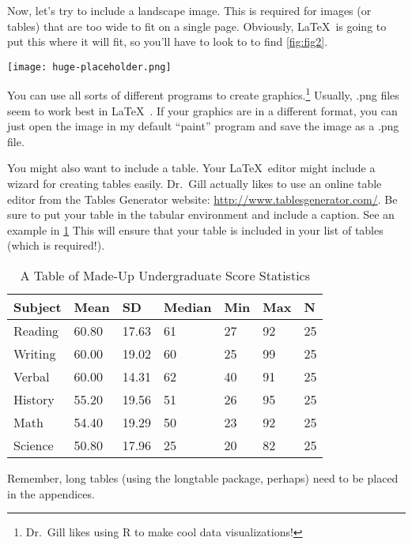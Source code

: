 Now, let's try to include a landscape image. This is required for images (or tables) that are too wide to fit on a single page. Obviously, \LaTeX\ is going to put this where it will fit, so you'll have to look to  to find \cref{fig:fig2}.

\begin{sidewaysfigure}
	\begin{center}
		\texttt{[image: huge-placeholder.png]}
\end{center}
\caption{\label{fig:fig2}This is a Landscape Figure}
\end{sidewaysfigure}

You can use all sorts of different programs to create graphics.\footnote{Dr.\ Gill likes using \textsf{R} to make cool data visualizations!} Usually, .png files seem to work best in \LaTeX\ . If your graphics are in a different format, you can just open the image in my default ``paint'' program and save the image as a .png file. 

You might also want to include a table. Your \LaTeX\ editor might include a wizard for creating tables easily. Dr.\ Gill actually likes to use an online table editor from the Tables Generator website: \url{http://www.tablesgenerator.com/}. Be sure to put your table in the tabular environment and include a caption. See an example in \cref{sampletable} This will ensure that your table is included in your list of tables (which is required!). 

\begin{table}[htbp]
\centering
\caption{A Table of Made-Up Undergraduate Score Statistics}
\label{sampletable}
\begin{tabular}{lllllll} \toprule
Subject & Mean  & SD    & Median & Min & Max & N  \\ \midrule
Reading & 60.80 & 17.63 & 61     & 27  & 92  & 25 \\
Writing & 60.00 & 19.02 & 60     & 25  & 99  & 25 \\
Verbal  & 60.00 & 14.31 & 62     & 40  & 91  & 25 \\
History & 55.20 & 19.56 & 51     & 26  & 95  & 25 \\
Math    & 54.40 & 19.29 & 50     & 23  & 92  & 25 \\
Science & 50.80 & 17.96 & 25     & 20  & 82  & 25 \\
\bottomrule
\end{tabular}
\end{table}

Remember, long tables (using the \textsf{longtable} package, perhaps) need to be placed in the appendices. 
